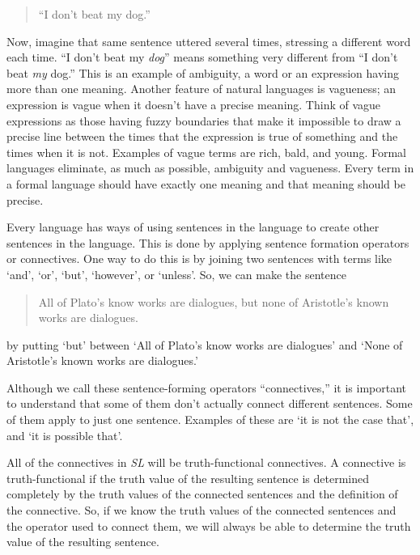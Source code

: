 \documentclass[../logic-text.tex]{subfiles}
\begin{document}
\begin{quote}
\enquote{I don't beat my dog.} 
\end{quote}

Now, imagine that same sentence uttered several times, stressing a different word each time.
\enquote{I don't beat my \emph{dog}} means something very different from \enquote{I don't beat \emph{my} dog.}
This is an example of ambiguity, a word or an expression having more than one meaning.
Another feature of natural languages is vagueness; an expression is vague when it doesn't have a precise meaning.
Think of vague expressions as those having fuzzy boundaries that make it impossible to draw a precise line between the times that the expression is true of something and the times when it is not.
Examples of vague terms are rich, bald, and young.
Formal languages eliminate, as much as possible, ambiguity and vagueness.
Every term in a formal language should have exactly one meaning and that meaning should be precise. 

Every language has ways of using sentences in the language to create other sentences in the language.
This is done by applying sentence formation operators or connectives.
One way to do this is by joining two sentences with terms like \enquote*{and}, \enquote*{or}, \enquote*{but}, \enquote*{however}, or \enquote*{unless}.
So, we can make the sentence

\begin{quote}
All of Plato's know works are dialogues, but none of Aristotle's known works are dialogues.
\end{quote}

by putting \enquote*{but} between \enquote*{All of Plato's know works are dialogues} and \enquote*{None of Aristotle's known works are dialogues.}  

Although we call these sentence-forming operators \enquote{connectives,} it is important to understand that some of them don't actually connect different sentences.
Some of them apply to just one sentence.
Examples of these are \enquote*{it is not the case that}, and \enquote*{it is possible that}.

All of the connectives in \emph{SL} will be truth-functional connectives.
A connective is truth-functional if the truth value of the resulting sentence is determined completely by the truth values of the connected sentences and the definition of the connective. So, if we know the truth values of the connected sentences and the operator used to connect them, we will always be able to determine the truth value of the resulting sentence.
\end{document}
